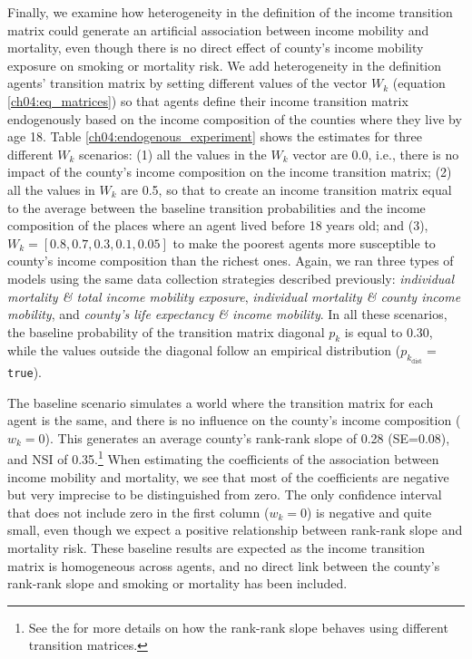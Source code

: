 \documentclass[class=article, crop=false, 12pt]{standalone}
\begin{document}
Finally, we examine how heterogeneity in the definition of the income transition matrix  could generate an artificial association between income mobility and mortality, even though there is no direct effect of county's income mobility exposure on smoking or mortality risk. We add heterogeneity in the definition agents' transition matrix by setting different values of the vector $W_k$ (equation \ref{ch04:eq_matrices}) so that agents define their income transition matrix endogenously based on the income composition of the counties where they live by age 18. Table \ref{ch04:endogenous_experiment} shows the estimates for three different $W_k$ scenarios: (1) all the values in the  $W_k$ vector are 0.0, i.e., there is no impact of the county's income composition on the income transition matrix; (2) all the values in $W_k$ are 0.5, so that to create an income transition matrix  equal to the average between the baseline transition probabilities and the income composition of the places where an agent lived before 18 years old; and (3), $W_k = [0.8, 0.7, 0.3, 0.1, 0.05]$ to make the poorest agents more susceptible to county's income composition than the richest ones. Again, we ran three types of models using the same data collection strategies described previously: \textit{individual mortality \& total income mobility exposure}, \textit{individual mortality \& county income mobility}, and \textit{county's life expectancy \& income mobility}. In all these scenarios, the baseline probability of the transition matrix diagonal $p_k$ is equal to 0.30, while the values outside the diagonal follow an empirical distribution ($p_{k_{\text{dist}}} = $\texttt{true}).

The baseline scenario simulates a world where the transition matrix for each agent is the same, and there is no influence on the county's income composition ($w_k=0$). This generates an average county's rank-rank slope of 0.28 (SE=0.08), and NSI of 0.35.\footnote{See the \textit{ } for more details on how the rank-rank slope behaves using different transition matrices.} When estimating the coefficients of the association between income mobility and mortality, we see that most of the coefficients are negative but very imprecise to be distinguished from zero. The only confidence interval that does not include zero in the first column ($w_k=0$) is negative and quite small, even though we expect a positive relationship between rank-rank slope and mortality risk. These baseline results are expected as the income transition matrix is homogeneous across agents, and no direct link between the county's rank-rank slope and smoking or mortality has been included. 
\end{document}
